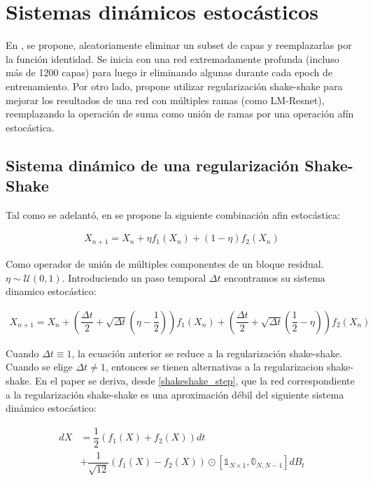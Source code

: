 \documentclass[titlepage,a4paper,oneside]{article}
\begin{document}
\section{Sistemas dinámicos estocásticos}
En \cite{huang2016deep}, se propone, aleatoriamente eliminar un subset de capas y reemplazarlas por la función identidad. Se inicia con una red extremadamente profunda (incluso más de 1200 capas) para luego ir eliminando algunas durante cada epoch de entrenamiento. Por otro lado, \cite{gastaldi2017shakeshake} propone utilizar regularización shake-shake para mejorar los resultados de una red con múltiples ramas (como LM-Resnet), reemplazando la operación de suma como unión de ramas por una operación afín estocástica.

\subsection{Sistema dinámico de una regularización Shake-Shake}
Tal como se adelantó, en \cite{gastaldi2017shakeshake} se propone la siguiente combinación afin estocástica:

\begin{align}
	X_{n+1} = X_n + \eta f_1(X_n) + (1-\eta) f_2 (X_n)
\end{align}

Como operador de unión de múltiples componentes de un bloque residual. $\eta \sim \mathscr{U}(0,1)$. Introduciendo un paso temporal $\Delta t$ encontramos su sistema dinamico estocástico:

\begin{align}\label{shakeshake_step}
	X_{n+1} = X_n + \left(\dfrac{\Delta t}{2} + \sqrt{\Delta t}(\eta - \dfrac{1}{2})\right) f_1(X_n) + \left( \dfrac{\Delta t}{2} + \sqrt{\Delta t} (\dfrac{1}{2} - \eta) \right) f_2(X_n)
\end{align}

Cuando $\Delta t \equiv 1$, la ecuación anterior se reduce a la regularización shake-shake. Cuando se elige $\Delta t \neq 1$, entonces se tienen alternativas a la regularizacion shake-shake. En el paper se deriva, desde \ref{shakeshake_step}, que la red correspondiente a la regularización shake-shake es una aproximación débil del siguiente sistema dinámico estocástico:

\begin{align}
	dX &= \dfrac{1}{2} (f_1(X) + f_2(X)) dt\\
	   &+ \dfrac{1}{\sqrt{12}} (f_1(X) - f_2(X)) \odot \left[ \mathbb{1}_{N\times 1}, \mathbb{0}_{N,N-1} \right] dB_t
\end{align}
\end{document}
